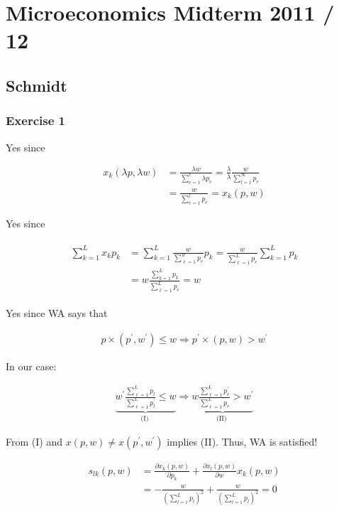 \section{Microeconomics Midterm 2011 / 12}

{
\subsection*{Schmidt}

\subsubsection*{Exercise 1}

\begin{enumerate}[label=(\alph*)]
{\item 
Yes since

\begin{align*}
    x_k(\lambda p, \lambda w) & =\frac{\lambda w}{\sum_{e=1}^c \lambda p_e}=\frac{\lambda}{\lambda} \frac{w}{\sum_{l=1}^{\infty} p_e} \\
    & =\frac{w}{\sum_{e=1}^l p_e}=x_k(p, w)
\end{align*}
}
{\item 
Yes since

\begin{align*}
\begin{aligned}
    \sum_{k=1}^L x_k p_k & =\sum_{k=1}^L \frac{w}{\sum_{\ell=1}^w p_e} p_k=\frac{w}{\sum_{\ell=1}^L p_e} \sum_{k=1}^L p_k \\
    & =w \frac{\sum_{k=1}^L p_k}{\sum_{\ell=1}^L p_e}=w
\end{aligned}
\end{align*}
}
{\item 
Yes since WA says that

\begin{align*}
    p \times\left(p^{\prime}, w^{\prime}\right) \leqslant w \Longrightarrow p^{\prime} \times(p, w)>w^{\prime}
\end{align*}

In our case:

\begin{align*}
    \underbrace{w^{\prime} \frac{\sum_{\ell=1}^L p_l}{\sum_{\ell=1}^L p_l^{\prime}} \leqslant w}_{\text {(I) }} \Rightarrow \underbrace{w \frac{\sum_{\ell=1}^L p_e^{\prime}}{\sum_{\ell=1}^L p_e}>w^{\prime}}_{\text {(II) }}
\end{align*}

From (I) and $x(p, w) \neq x\left(p^{\prime}, w^{\prime}\right)$ implies (II). Thus, WA is satisfied!
}
{\item 
\begin{align*}
    s_{l k}(p, w) & =\frac{\partial x_k(p, w)}{\partial p_k}+\frac{\partial x_l(p, w)}{\partial w} x_k(p, w) \\
    & =-\frac{w}{\left(\sum_{l=1}^L p_l\right)^2}+\frac{w}{\left(\sum_{l=1}^L p_l\right)^2}=0
\end{align*}

}
\end{enumerate}}
